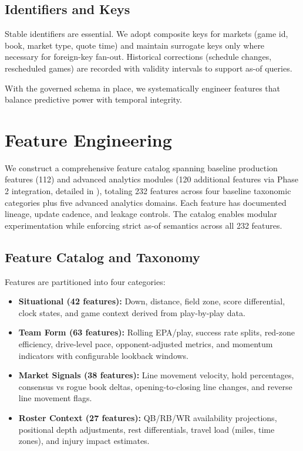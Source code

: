 \subsection{Identifiers and Keys}
Stable identifiers are essential. We adopt composite keys for markets (game id, book, market type, quote time) and maintain surrogate keys only where necessary for foreign-key fan-out. Historical corrections (schedule changes, rescheduled games) are recorded with validity intervals to support as-of queries.

With the governed schema in place, we systematically engineer features that balance predictive power with temporal integrity.

\section{Feature Engineering}
\label{sec:feature-engineering}

We construct a comprehensive feature catalog spanning baseline production features (112) and advanced analytics modules (120 additional features via Phase 2 integration, detailed in ), totaling 232 features across four baseline taxonomic categories plus five advanced analytics domains. Each feature has documented lineage, update cadence, and leakage controls. The catalog enables modular experimentation while enforcing strict as-of semantics across all 232 features.

\subsection{Feature Catalog and Taxonomy}
\label{subsec:feature-catalog}

Features are partitioned into four categories:
\begin{itemize}
  \item \textbf{Situational (42 features):} Down, distance, field zone, score differential, clock states, and game context derived from play-by-play data.
  \item \textbf{Team Form (63 features):} Rolling EPA/play, success rate splits, red-zone efficiency, drive-level pace, opponent-adjusted metrics, and momentum indicators with configurable lookback windows.
  \item \textbf{Market Signals (38 features):} Line movement velocity, hold percentages, consensus vs rogue book deltas, opening-to-closing line changes, and reverse line movement flags.
  \item \textbf{Roster Context (27 features):} QB/RB/WR availability projections, positional depth adjustments, rest differentials, travel load (miles, time zones), and injury impact estimates.
\end{itemize}

